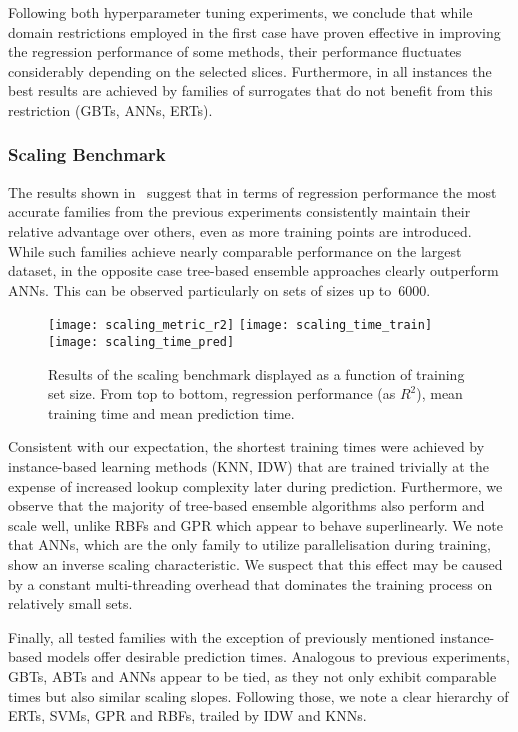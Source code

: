 Following both hyperparameter tuning experiments, we conclude that while domain
restrictions employed in the first case have proven effective in improving the
regression performance of some methods, their performance fluctuates considerably
depending on the selected slices. Furthermore, in all instances the best
results are achieved by families of surrogates that do not benefit from this
restriction (GBTs, ANNs, ERTs).


\subsubsection{Scaling Benchmark}
\label{sec:res-exp3}

The results shown in~ suggest that in terms of regression
performance the most accurate families from the previous experiments
consistently maintain their relative advantage over others, even as
more training points are introduced. While such families achieve nearly comparable
performance on the largest dataset, in the opposite case tree-based ensemble approaches
clearly outperform ANNs. This can be observed
particularly on sets of sizes up to~\num{6000}.

\begin{figure}
	\centering
	\texttt{[image: scaling\_metric\_r2]}
	\texttt{[image: scaling\_time\_train]}
	\texttt{[image: scaling\_time\_pred]}
	\caption{Results of the scaling benchmark displayed as a function of
	training set size. From top to bottom, regression performance (as $R^2$),
	mean training time and mean prediction time.}
	\label{fig:scaling}
\end{figure}

Consistent with our expectation, the shortest training times were achieved by
instance-based learning methods (KNN, IDW) that
are trained trivially at the expense of increased lookup complexity later during prediction.
Furthermore, we observe that the majority of tree-based ensemble algorithms also perform
and scale well, unlike RBFs and GPR which appear to behave superlinearly. We note that ANNs,
which are the only family to utilize parallelisation during training, show an
inverse scaling characteristic. We suspect that this effect may be caused
by a constant multi-threading overhead that dominates the training process
on relatively small sets.

Finally, all tested families with the exception of previously mentioned instance-based
models offer desirable prediction times. Analogous to previous experiments,
GBTs, ABTs and ANNs appear to be tied, as they not only exhibit
comparable times but also similar scaling slopes. Following those, we note a
clear hierarchy of ERTs, SVMs, GPR and RBFs, trailed by IDW and KNNs.


